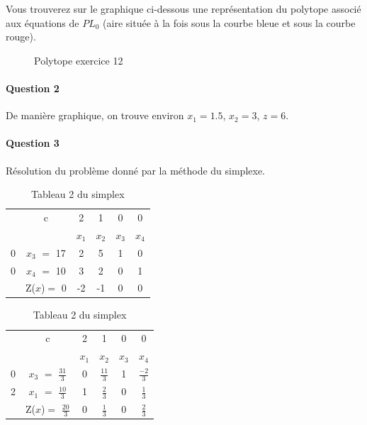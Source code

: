 \documentclass[a4paper, 12pt]{article}
\begin{document}
Vous trouverez sur le graphique ci-dessous une représentation du
polytope associé aux équations de $PL_0$ (aire située à la fois sous la courbe
bleue et sous la courbe rouge).

\begin{figure}[h!]
\centering
{}
\caption{Polytope exercice 12}
\end{figure}

\paragraph{Question 2}
De manière graphique, on trouve environ $x_1 = 1.5$, $x_2 = 3$, $z = 6$.

\paragraph{Question 3}

Résolution du problème donné par la méthode du simplexe.

\begin{table}[h!]	
\centering
	\begin{tabular}{|c|c|c|c|c|c|}
	\hline
      & c & 2 & 1 & 0 & 0 \\ 
      \cline{2-6}
       &  & $x_{1}$ & $x_{2}$  & $x_{3}$  & $x_{4}$ \\
       \hline
   0 & $x_{3}$  $=$ 17 & 2 & 5 & 1 & 0 \\
      \hline
	0 & $x_{4}$ $=$ 10  & 3 & 2 & 0 & 1 \\
	  \hline
	 & Z($x$)$=$ 0 & -2 & -1 & 0 & 0\\
	  \hline
	\end{tabular}
\caption {Tableau 1 du simplex}	
\centering
	\begin{tabular}{|c|c|c|c|c|c|}
	\hline
      & c & 2 & 1 & 0 & 0 \\ 
      \cline{2-6}
       &  & $x_{1}$ & $x_{2}$  & $x_{3}$  & $x_{4}$ \\
       \hline
   0 & $x_{3}$  $=$ $\frac{31}{3}$ & 0 & $\frac{11}{3}$ & 1 & $\frac{-2}{3}$ \\
      \hline
	2 & $x_{1}$ $=$ $\frac{10}{3}$  & 1 & $\frac{2}{3}$ & 0 & $\frac{1}{3}$ \\
	  \hline
	 & Z($x$)$=$ $\frac{20}{3}$ & 0 & $\frac{1}{3}$ & 0 & $\frac{2}{3}$\\
	  \hline
	\end{tabular}
\caption {Tableau 2 du simplex}
\end{table}
\end{document}
